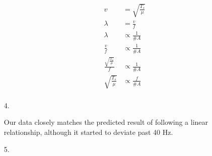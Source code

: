 \documentclass[12pt, letterpaper]{article}
\begin{document}
\begin{itemize}
        \begin{align*}
            v       
                & = \sqrt{\frac{T_{s}}{\mu}}        \\
            \lambda 
                & = \frac{v}{f}                     \\
            \lambda 
                & \propto \frac{1}{\#A}             \\
            \frac{v}{f} 
                & \propto \frac{1}{\#A}             \\
            \frac{\sqrt{\frac{T_{s}}{\mu}}}{f}
                & \propto \frac{1}{\#A}             \\
            \sqrt{\frac{T_{s}}{\mu}}
                & \propto \frac{f}{\#A}             \\
        \end{align*}

        \pagebreak

        \item [4.]\mbox{}
        
        {\centering{}}

        Our data closely matches the predicted result of following a linear relationship, although it started to deviate past 40 Hz.
        \item [5.]\mbox{}
        
        {\centering{}}


\end{itemize}
\end{document}
